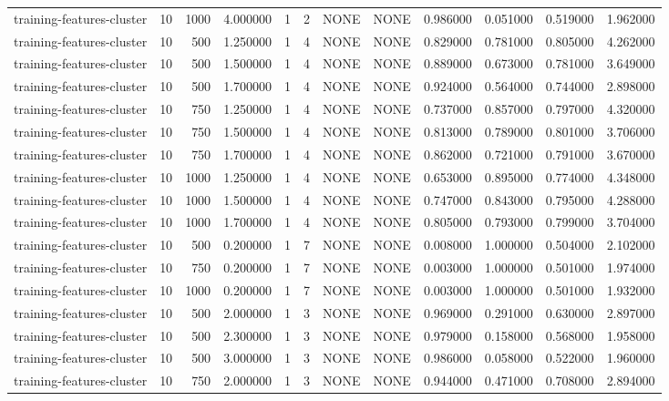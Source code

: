 \begin{tabular}{lrrrllllrrrr}
training-features-cluster & 10 & 1000 & 4.000000 & 1 & 2 & NONE & NONE & 0.986000 & 0.051000 & 0.519000 & 1.962000 \\
training-features-cluster & 10 & 500 & 1.250000 & 1 & 4 & NONE & NONE & 0.829000 & 0.781000 & 0.805000 & 4.262000 \\
training-features-cluster & 10 & 500 & 1.500000 & 1 & 4 & NONE & NONE & 0.889000 & 0.673000 & 0.781000 & 3.649000 \\
training-features-cluster & 10 & 500 & 1.700000 & 1 & 4 & NONE & NONE & 0.924000 & 0.564000 & 0.744000 & 2.898000 \\
training-features-cluster & 10 & 750 & 1.250000 & 1 & 4 & NONE & NONE & 0.737000 & 0.857000 & 0.797000 & 4.320000 \\
training-features-cluster & 10 & 750 & 1.500000 & 1 & 4 & NONE & NONE & 0.813000 & 0.789000 & 0.801000 & 3.706000 \\
training-features-cluster & 10 & 750 & 1.700000 & 1 & 4 & NONE & NONE & 0.862000 & 0.721000 & 0.791000 & 3.670000 \\
training-features-cluster & 10 & 1000 & 1.250000 & 1 & 4 & NONE & NONE & 0.653000 & 0.895000 & 0.774000 & 4.348000 \\
training-features-cluster & 10 & 1000 & 1.500000 & 1 & 4 & NONE & NONE & 0.747000 & 0.843000 & 0.795000 & 4.288000 \\
training-features-cluster & 10 & 1000 & 1.700000 & 1 & 4 & NONE & NONE & 0.805000 & 0.793000 & 0.799000 & 3.704000 \\
training-features-cluster & 10 & 500 & 0.200000 & 1 & 7 & NONE & NONE & 0.008000 & 1.000000 & 0.504000 & 2.102000 \\
training-features-cluster & 10 & 750 & 0.200000 & 1 & 7 & NONE & NONE & 0.003000 & 1.000000 & 0.501000 & 1.974000 \\
training-features-cluster & 10 & 1000 & 0.200000 & 1 & 7 & NONE & NONE & 0.003000 & 1.000000 & 0.501000 & 1.932000 \\
training-features-cluster & 10 & 500 & 2.000000 & 1 & 3 & NONE & NONE & 0.969000 & 0.291000 & 0.630000 & 2.897000 \\
training-features-cluster & 10 & 500 & 2.300000 & 1 & 3 & NONE & NONE & 0.979000 & 0.158000 & 0.568000 & 1.958000 \\
training-features-cluster & 10 & 500 & 3.000000 & 1 & 3 & NONE & NONE & 0.986000 & 0.058000 & 0.522000 & 1.960000 \\
training-features-cluster & 10 & 750 & 2.000000 & 1 & 3 & NONE & NONE & 0.944000 & 0.471000 & 0.708000 & 2.894000 \\

\end{tabular}
